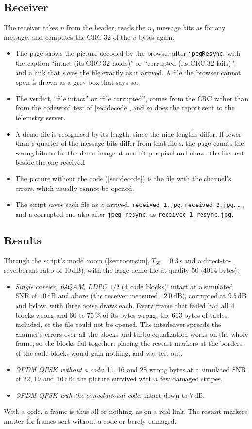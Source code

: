 \documentclass[11pt,a4paper]{article}
\newcommand{\dB}{\,\mathrm{dB}}
\newcommand{\code}[1]{\texttt{#1}}
\newcommand{\nz}{n_{0}}
\theoremstyle{remark}
\begin{document}
\subsection{Receiver}
The receiver takes $n$ from the header, reads the $\nz$ message bits as for any message, and computes the CRC-32 of the $n$ bytes again.
\begin{itemize}
\item The page shows the picture decoded by the browser after \code{jpegResync}, with the caption ``intact (its CRC-32 holds)'' or ``corrupted (its CRC-32 fails)'', and a link that saves the file exactly as it arrived. A file the browser cannot open is drawn as a grey box that says so.
\item The verdict, ``file intact'' or ``file corrupted'', comes from the CRC rather than from the codeword test of \cref{sec:decode}, and so does the report sent to the telemetry server.
\item A demo file is recognised by its length, since the nine lengths differ. If fewer than a quarter of the message bits differ from that file's, the page counts the wrong bits as for the demo image at one bit per pixel and shows the file sent beside the one received.
\item The picture without the code (\cref{sec:decode}) is the file with the channel's errors, which usually cannot be opened.
\item The script saves each file as it arrived, \code{received\_1.jpg}, \code{received\_2.jpg}, \ldots, and a corrupted one also after \code{jpeg\_resync}, as \code{received\_1\_resync.jpg}.
\end{itemize}

\subsection{Results}
\label{sec:jpegres}
Through the script's model room (\cref{sec:roomsim}, $T_{60} = 0.3$\,s and a direct-to-reverberant ratio of $10\dB$), with the large demo file at quality 50 (4014 bytes):
\begin{itemize}
\item \emph{Single carrier, 64QAM, LDPC $1/2$} (4 code blocks): intact at a simulated SNR of $10\dB$ and above (the receiver measured $12.0\dB$), corrupted at $9.5\dB$ and below, with three noise draws each. Every frame that failed had all 4 blocks wrong and 60 to $75\,\%$ of its bytes wrong, the 613 bytes of tables included, so the file could not be opened. The interleaver spreads the channel's errors over all the blocks and turbo equalization works on the whole frame, so the blocks fail together: placing the restart markers at the borders of the code blocks would gain nothing, and was left out.
\item \emph{OFDM QPSK without a code}: 11, 16 and 28 wrong bytes at a simulated SNR of 22, 19 and $16\dB$; the picture survived with a few damaged stripes.
\item \emph{OFDM QPSK with the convolutional code}: intact down to $7\dB$.
\end{itemize}
With a code, a frame is thus all or nothing, as on a real link. The restart markers matter for frames sent without a code or barely damaged.
\end{document}
